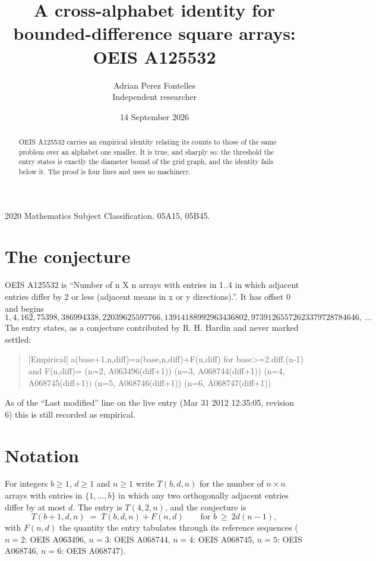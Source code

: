 \documentclass[11pt,a4paper]{article}
\title{A cross-alphabet identity for bounded-difference square arrays: OEIS A125532}
\author{Adrian Perez Fontelles\\ \small Independent researcher}
\date{14 September 2026}
\theoremstyle{plain}
\theoremstyle{definition}
\begin{document}
\maketitle

\begin{abstract}
OEIS A125532 carries an empirical identity relating its counts to those of the same problem over an
alphabet one smaller. It is true, and sharply so: the threshold the entry states is exactly the
diameter bound of the grid graph, and the identity fails below it. The proof is four lines and
uses no machinery.
\end{abstract}

\noindent\small 2020 Mathematics Subject Classification. 05A15, 05B45.\normalsize

\section{The conjecture}

OEIS A125532 is ``Number of n X n arrays with entries in 1..4 in which adjacent entries differ by 2 or less (adjacent means in x or y directions).''. It has offset $0$ and begins
\[
1, 4, 162, 75398, 386994338, 22039625597766, 13914188992963436802, 97391265572623379728784646,\ \dots
\]
The entry states, as a conjecture contributed by R. H. Hardin and never marked settled:
\begin{quote}
[Empirical] a(base+1,n,diff)=a(base,n,diff)+F(n,diff) for base>=2.diff.(n-1) and F(n,diff)= (n=2, A063496(diff+1)) (n=3, A068744(diff+1)) (n=4, A068745(diff+1)) (n=5, A068746(diff+1)) (n=6, A068747(diff+1))
\end{quote}
As of the ``Last modified'' line on the live entry (Mar 31 2012 12:35:05, revision 6)
this is still recorded as empirical.

\section{Notation}

For integers $b\ge1$, $d\ge1$ and $n\ge1$ write $T(b,d,n)$ for the number of $n\times n$ arrays
with entries in $\{1,\dots,b\}$ in which any two orthogonally adjacent entries differ by at
most $d$. The entry is $T(4,2,n)$, and the conjecture is
\[
T(b+1,d,n)\;=\;T(b,d,n)+F(n,d)\qquad\text{for } b\ \ge\ 2d(n-1),
\]
with $F(n,d)$ the quantity the entry tabulates through its reference sequences ($n=2$: OEIS A063496, $n=3$: OEIS A068744, $n=4$: OEIS A068745, $n=5$: OEIS A068746, $n=6$: OEIS A068747).
\end{document}
